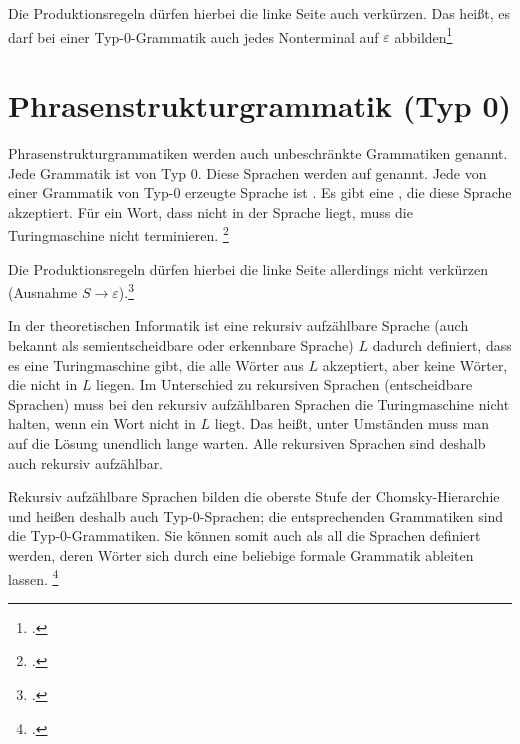 \documentclass{bschlangaul-theorie}
\begin{document}
Die Produktionsregeln dürfen hierbei die linke Seite auch verkürzen. Das
heißt, es darf bei einer Typ-0-Grammatik auch jedes Nonterminal auf
$\varepsilon$ abbilden\footcite[Seite 13-14]{theo:fs:3}

%

\section{Phrasenstrukturgrammatik (Typ 0)}

Phrasenstrukturgrammatiken werden auch unbeschränkte Grammatiken
genannt. Jede Grammatik ist von Typ 0. Diese Sprachen werden auf
 genannt. Jede von einer Grammatik von Typ-0
erzeugte Sprache ist . Es gibt eine
, die diese Sprache akzeptiert. Für ein Wort, dass
nicht in der Sprache liegt, muss die Turingmaschine nicht terminieren.
\footcite[Seite 13-14]{theo:fs:3}
%

Die Produktionsregeln dürfen hierbei die linke Seite allerdings nicht
verkürzen (Ausnahme $S \rightarrow \varepsilon$).\footcite{theo:fs:3}

In der theoretischen Informatik ist eine rekursiv aufzählbare Sprache
(auch bekannt als semientscheidbare oder erkennbare Sprache) $L$ dadurch
definiert, dass es eine Turingmaschine gibt, die alle Wörter aus $L$
akzeptiert, aber keine Wörter, die nicht in $L$ liegen. Im Unterschied
zu rekursiven Sprachen (entscheidbare Sprachen) muss bei den rekursiv
aufzählbaren Sprachen die Turingmaschine nicht halten, wenn ein Wort
nicht in $L$ liegt. Das heißt, unter Umständen muss man auf die Lösung
unendlich lange warten. Alle rekursiven Sprachen sind deshalb auch
rekursiv aufzählbar.

Rekursiv aufzählbare Sprachen bilden die oberste Stufe der
Chomsky-Hierarchie und heißen deshalb auch Typ-0-Sprachen; die
entsprechenden Grammatiken sind die Typ-0-Grammatiken. Sie können somit
auch als all die Sprachen definiert werden, deren Wörter sich durch eine
beliebige formale Grammatik ableiten lassen.
\footcite{wiki:rekursiv-aufzaehlbare-sprache}

\literatur
\end{document}
